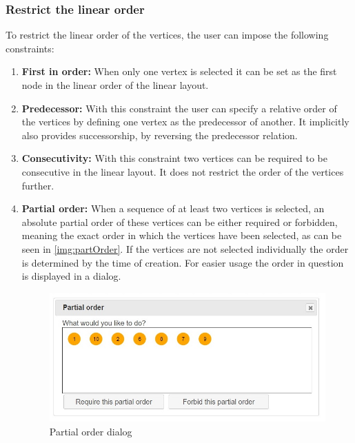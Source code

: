{\subsubsection{Restrict the linear order}
\label{linRestr}
To restrict the linear order of the vertices, the user can impose the following constraints:
\begin{enumerate}
\item \textbf{First in order:} When only one vertex is selected it can be set as the first node in the linear order of the linear layout.
\item \textbf{Predecessor:} With this constraint the user can specify a relative order of the vertices by defining one vertex as the predecessor of another. It implicitly also provides successorship, by reversing the predecessor relation.
\item \textbf{Consecutivity:} With this constraint two vertices can be required to be consecutive in the linear layout. It does not restrict the order of the vertices further.
\item \textbf{Partial order:} When a sequence of at least two vertices is selected, an absolute partial order of these vertices can be either required or forbidden, meaning the exact order in which the vertices have been selected, as can be seen in \autoref{img:partOrder}. If the vertices are not selected individually the order is determined by the time of creation. For easier usage the order in question is displayed in a dialog. 
\begin{figure}
\begin{center}
\includegraphics[width=\textwidth]{figures/figIndex/PartialOrder.jpg}
\caption{Partial order dialog}
\label{img:partOrder}
\end{center}
\end{figure}
\end{enumerate}

}
